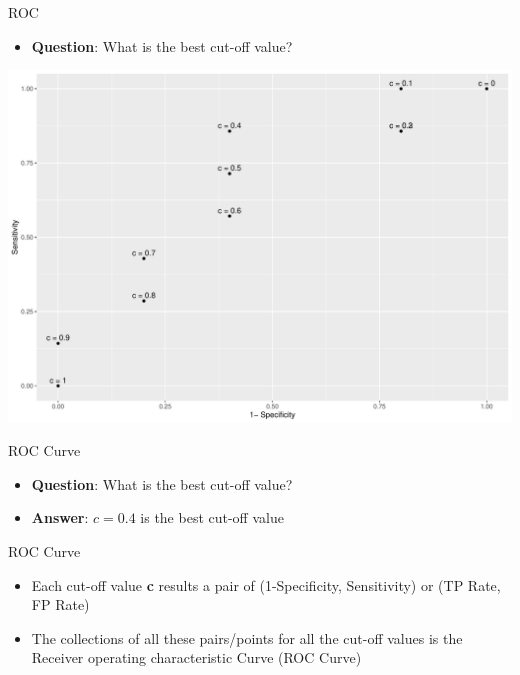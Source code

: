 \documentclass[
  ignorenonframetext,
]{beamer}
\providecommand{\tightlist}{%
  \setlength{\itemsep}{0pt}\setlength{\parskip}{0pt}}
\begin{document}
\begin{frame}{ROC}
\protect\hypertarget{roc}{}

\begin{itemize}
\tightlist
\item
  \textbf{Question}: What is the best cut-off value?
\end{itemize}

\includegraphics{fa_measuring_performance2_files/figure-beamer/unnamed-chunk-4-1.pdf}

\end{frame}

\begin{frame}{ROC Curve}
\protect\hypertarget{roc-curve}{}

\begin{itemize}
\tightlist
\item
  \textbf{Question}: What is the best cut-off value?
\item
  \textbf{Answer}: \(c = 0.4\) is the best cut-off value
\end{itemize}

\end{frame}

\begin{frame}{ROC Curve}
\protect\hypertarget{roc-curve-1}{}

\begin{itemize}
\tightlist
\item
  Each cut-off value \textbf{c} results a pair of (1-Specificity,
  Sensitivity) or (TP Rate, FP Rate)
\item
  The collections of all these pairs/points for all the cut-off values
  is the Receiver operating characteristic Curve (ROC Curve)
\end{itemize}

\end{frame}
\end{document}
